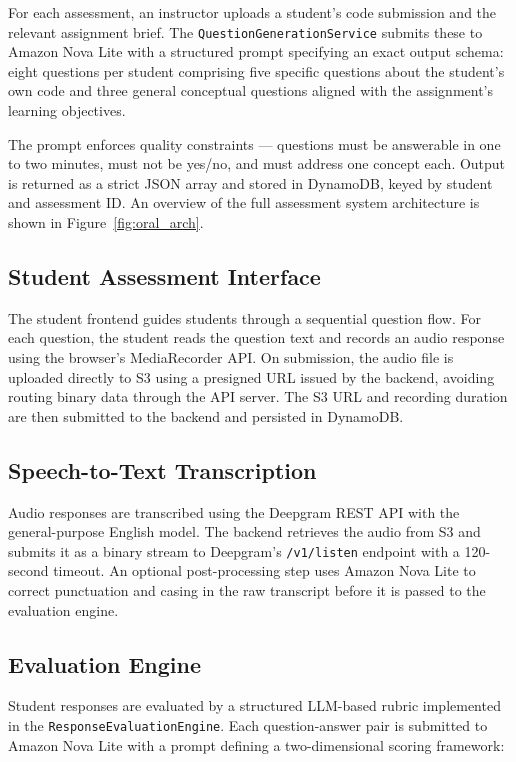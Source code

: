 For each assessment, an instructor uploads a student's code submission and the relevant assignment brief. The \texttt{QuestionGenerationService} submits these to Amazon Nova Lite with a structured prompt specifying an exact output schema: eight questions per student comprising five specific questions about the student's own code and three general conceptual questions aligned with the assignment's learning objectives.

The prompt enforces quality constraints — questions must be answerable in one to two minutes, must not be yes/no, and must address one concept each. Output is returned as a strict JSON array and stored in DynamoDB, keyed by student and assessment ID. An overview of the full assessment system architecture is shown in Figure~\ref{fig:oral_arch}.

\subsection{Student Assessment Interface}

The student frontend guides students through a sequential question flow. For each question, the student reads the question text and records an audio response using the browser's MediaRecorder API. On submission, the audio file is uploaded directly to S3 using a presigned URL issued by the backend, avoiding routing binary data through the API server. The S3 URL and recording duration are then submitted to the backend and persisted in DynamoDB.

\subsection{Speech-to-Text Transcription}

Audio responses are transcribed using the Deepgram REST API with the general-purpose English model. The backend retrieves the audio from S3 and submits it as a binary stream to Deepgram's \texttt{/v1/listen} endpoint with a 120-second timeout. An optional post-processing step uses Amazon Nova Lite to correct punctuation and casing in the raw transcript before it is passed to the evaluation engine.

\subsection{Evaluation Engine}

Student responses are evaluated by a structured LLM-based rubric implemented in the \texttt{ResponseEvaluationEngine}. Each question-answer pair is submitted to Amazon Nova Lite with a prompt defining a two-dimensional scoring framework:

